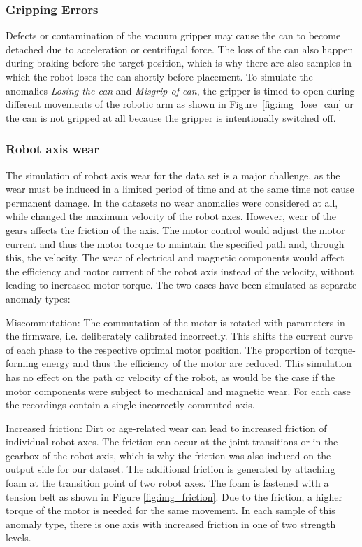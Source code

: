 \documentclass[journal]{IEEEtran}
\newenvironment{packed_enum}{
\begin{itemize}
  \setlength{\itemsep}{3pt}
  \setlength{\parskip}{0pt}
  \setlength{\parsep}{0pt}
}{\end{itemize}}
\begin{document}
\subsubsection{Gripping Errors} 
Defects or contamination of the vacuum gripper may cause the can to become detached due to acceleration or centrifugal force. The loss of the can also happen during braking before the target position, which is why there are also samples in which the robot loses the can shortly before placement. To simulate the anomalies \textit{Losing the can} and \textit{Misgrip of can}, the gripper is timed to open during different movements of the robotic arm as shown in Figure~\ref{fig:img_lose_can} or the can is not gripped at all because the gripper is intentionally switched off. 

\subsubsection{Robot axis wear}
{The simulation of robot axis wear for the data set is a major challenge, as the wear must be induced in a limited period of time and at the same time not cause permanent damage.
In the datasets \cite{swvae, rnn_vae, zhang2021robot, aursad} no wear anomalies were considered at all, while \cite{hornung2014model} changed the maximum velocity of the robot axes.
However, wear of the gears affects the friction of the axis.
The motor control would adjust the motor current and thus the motor torque to maintain the specified path and, through this, the velocity. 
The wear of electrical and magnetic components would affect the efficiency and motor current of the robot axis instead of the velocity, without leading to increased motor torque.
The two cases have been simulated as separate anomaly types:}



\begin{packed_enum}
    \item Miscommutation:
    {The commutation of the motor is rotated with parameters in the firmware, i.e. deliberately calibrated incorrectly. This shifts the current curve of each phase to the respective optimal motor position. The proportion of torque-forming energy and thus the efficiency of the motor are reduced. This simulation has no effect on the path or velocity of the robot, as would be the case if the motor components were subject to mechanical and magnetic wear.}
    For each case the recordings contain a single incorrectly commuted axis.
    \item Increased friction:
    Dirt or age-related wear can lead to increased friction of individual robot axes. 
    {The friction can occur at the joint transitions or in the gearbox of the robot axis, which is why the friction was also induced on the output side for our dataset.}
    The additional friction is generated by attaching foam at the transition point of two robot axes.
    The foam is fastened with a tension belt as shown in Figure \ref{fig:img_friction}.
    {Due to the friction, a higher torque of the motor is needed for the same movement.}
    In each sample of this anomaly type, there is one axis with increased friction in one of two strength levels. 
\end{packed_enum}
\end{document}
